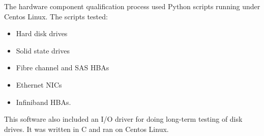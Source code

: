 \documentclass[10pt,a4paper,sans]{moderncv}
\begin{document}
{The hardware component qualification process used Python scripts running under Centos Linux.
                          The scripts tested:
                          \begin{itemize}
                              \item Hard disk drives
                              \item Solid state drives
                              \item Fibre channel and SAS HBAs
                              \item Ethernet NICs
                              \item Infiniband HBAs.
                          \end{itemize}
                          This software also included an I/O driver for doing long-term testing of disk drives. It was written in C
                          and ran on Centos Linux.}

\end{document}
